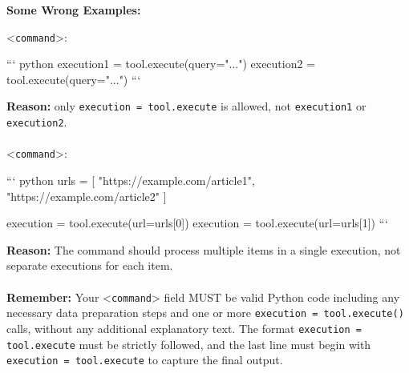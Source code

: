\begin{textcolorbox}
\textbf{Some Wrong Examples:}

\textless{}\texttt{command}\textgreater{}:
\begin{codebox}
```
python
execution1 = tool.execute(query="...")
execution2 = tool.execute(query="...")
```
\end{codebox}


\textbf{Reason:} only \texttt{execution = tool.execute} is allowed, not \texttt{execution1} or \texttt{execution2}.
\\\\
\textless{}\texttt{command}\textgreater{}:
\begin{codebox}
```
python
urls = [
    "https://example.com/article1",
    "https://example.com/article2"
]

execution = tool.execute(url=urls[0])
execution = tool.execute(url=urls[1])
```
\end{codebox}

\textbf{Reason:} The command should process multiple items in a single execution, not separate executions for each item.
\\\\
\textbf{Remember:} Your \textless{}\texttt{command}\textgreater{} field MUST be valid Python code including any necessary data preparation steps and one or more \texttt{execution = tool.execute()} calls, without any additional explanatory text. The format \texttt{execution = tool.execute} must be strictly followed, and the last line must begin with \texttt{execution = tool.execute} to capture the final output.
\end{textcolorbox}